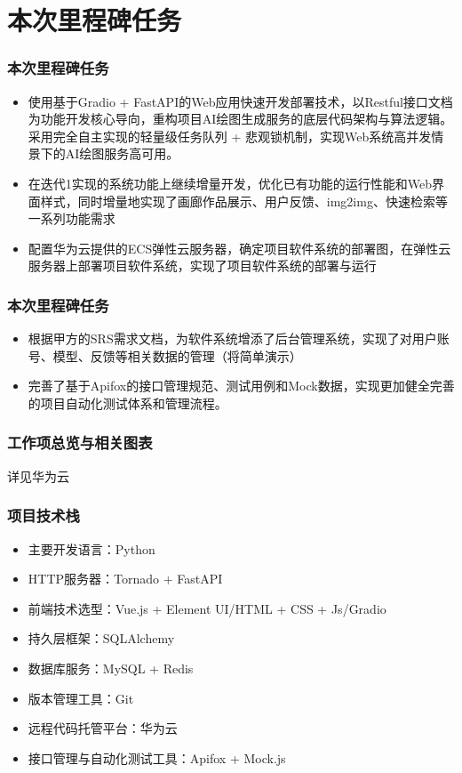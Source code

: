 \section{本次里程碑任务}
\begin{frame}
    \frametitle{本次里程碑任务}
    \begin{itemize}
        \item 使用基于Gradio + FastAPI的Web应用快速开发部署技术，以Restful接口文档为功能开发核心导向，重构项目AI绘图生成服务的底层代码架构与算法逻辑。采用完全自主实现的轻量级任务队列 + 悲观锁机制，实现Web系统高并发情景下的AI绘图服务高可用。
        \item 在迭代1实现的系统功能上继续增量开发，优化已有功能的运行性能和Web界面样式，同时增量地实现了画廊作品展示、用户反馈、img2img、快速检索等一系列功能需求
        \item 配置华为云提供的ECS弹性云服务器，确定项目软件系统的部署图，在弹性云服务器上部署项目软件系统，实现了项目软件系统的部署与运行
    \end{itemize}
\end{frame}

\begin{frame}
    \frametitle{本次里程碑任务}
    \begin{itemize}
        \item 根据甲方的SRS需求文档，为软件系统增添了后台管理系统，实现了对用户账号、模型、反馈等相关数据的管理（将简单演示）
        \item 完善了基于Apifox的接口管理规范、测试用例和Mock数据，实现更加健全完善的项目自动化测试体系和管理流程。
    \end{itemize}
\end{frame}

\begin{frame}
    \frametitle{工作项总览与相关图表}
    详见华为云
\end{frame}


\begin{frame}
    \frametitle{项目技术栈}
    \begin{itemize}
        \item 主要开发语言：Python
        \item HTTP服务器：Tornado + FastAPI
        \item 前端技术选型：Vue.js + Element UI/HTML + CSS + Js/Gradio
        \item 持久层框架：SQLAlchemy
        \item 数据库服务：MySQL + Redis
        \item 版本管理工具：Git
        \item 远程代码托管平台：华为云
        \item 接口管理与自动化测试工具：Apifox + Mock.js
    \end{itemize}
\end{frame}